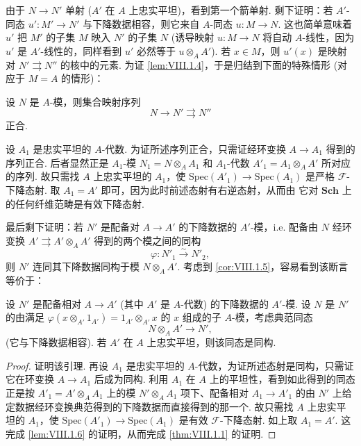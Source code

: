 由于 $N \to N'$ 单射 ($A'$ 在 $A$ 上忠实平坦)，看到第一个箭单射. 剩下证明：若 $A'$-同态 $u' \colon M' \to N'$ 与下降数据相容，则它来自 $A$-同态 $u \colon M \to N$. 这也简单意味着 $u'$ 把 $M'$ 的子集 $M$ 映入 $N'$ 的子集 $N$ (诱导映射 $u \colon M \to N$ 将自动 $A$-线性，因为 $u'$ 是 $A'$-线性的，同样看到 $u'$ 必然等于 $u \otimes_A A'$). 若 $x \in M$，则 $u'(x)$ 是映射对 $N' \rightrightarrows N''$ 的核中的元素. 为证 \ref{lem:VIII.1.4}，于是归结到下面的特殊情形 (对应于 $M = A$ 的情形)：

\begin{corollary}\label{cor:VIII.1.5}
设 $N$ 是 $A$-模，则集合映射序列
\[
N \longrightarrow N' \rightrightarrows N''
\]
正合.
\end{corollary}

设 $A_1$ 是忠实平坦的 $A$-代数. 为证所述序列正合，只需证经环变换 $A \to A_1$ 得到的序列正合. 后者显然正是 $A_1$-模 $N_1 = N \otimes_A A_1$ 和 $A_1$-代数 $A'_1 = A_1 \otimes_A A'$ 所对应的序列. 故只需找 $A$ 上忠实平坦的 $A_1$，使 $\mathrm{Spec}(A'_1) \to \mathrm{Spec}(A_1)$ 是严格 $\mathcal{F}$-下降态射. 取 $A_1 = A'$ 即可，因为此时前述态射有右逆态射，从而由 \cite{exp08-D} 它对 $\mathbf{Sch}$ 上的任何纤维范畴是有效下降态射.

最后剩下证明：若 $N'$ 是配备对 $A \to A'$ 的下降数据的 $A'$-模，i.e. 配备由 $N$ 经环变换 $A' \rightrightarrows A' \otimes_A A'$ 得到的两个模之间的同构
\[
\varphi \colon N'_1 \xrightarrow{\sim} N'_2,
\]
则 $N'$ 连同其下降数据同构于模 $N \otimes_A A'$. 考虑到 \ref{cor:VIII.1.5}，容易看到该断言等价于：

\begin{lemma}\label{lem:VIII.1.6}
设 $N'$ 是配备相对 $A \to A'$ (其中 $A'$ 是 $A$-代数) 的下降数据的 $A'$-模. 设 $N$ 是 $N'$ 的由满足 $\varphi(x \otimes_{A'} 1_{A'}) = 1_{A'} \otimes_{A'} x$ 的 $x$ 组成的子 $A$-模，考虑典范同态
\[
N \otimes_A A' \longrightarrow N',
\]
(它与下降数据相容). 若 $A'$ 在 $A$ 上忠实平坦，则该同态是同构.
\end{lemma}

\begin{proof}
证明该引理. 再设 $A_1$ 是忠实平坦的 $A$-代数，为证所述态射是同构，只需证它在环变换 $A \to A_1$ 后成为同构. 利用 $A_1$ 在 $A$ 上的平坦性，看到如此得到的同态正是按 $A'_1 = A' \otimes_A A_1$ 上的模 $N' \otimes_A A_1$ 项下、配备相对 $A_1 \to A'_1$ 的由 $N'$ 上给定数据经环变换典范得到的下降数据而直接得到的那一个. 故只需找 $A$ 上忠实平坦的 $A_1$，使 $\mathrm{Spec}(A'_1) \to \mathrm{Spec}(A_1)$ 是有效 $\mathcal{F}$-下降态射. 如上取 $A_1 = A'$. 这完成 \ref{lem:VIII.1.6} 的证明，从而完成 \ref{thm:VIII.1.1} 的证明.
\end{proof}

